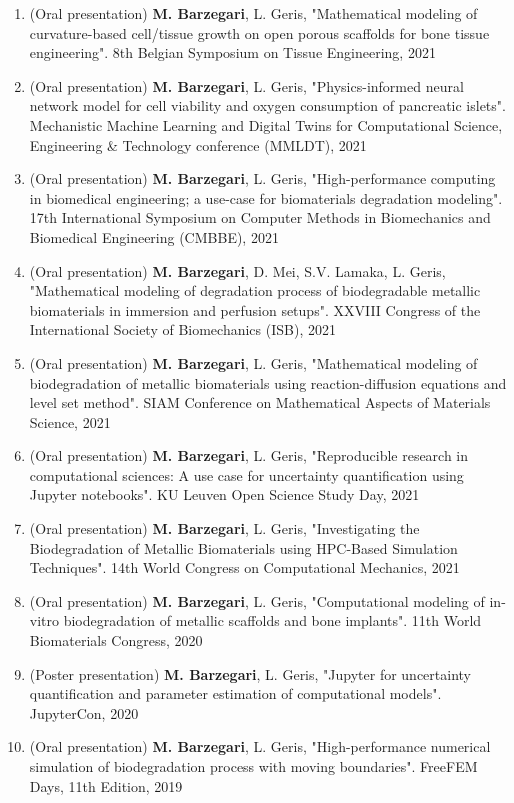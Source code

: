 \documentclass{cv}
\begin{document}
\begin{enumerate}[itemsep=-0.2ex]
\item
(Oral presentation) 
\textbf{M. Barzegari}, L. Geris, "Mathematical modeling of curvature-based cell/tissue growth on open porous scaffolds for bone tissue engineering". 8th Belgian Symposium on Tissue Engineering, 2021
\item
(Oral presentation)
\textbf{M. Barzegari}, L. Geris, "Physics-informed neural network model for cell viability and oxygen consumption of pancreatic islets". Mechanistic Machine Learning and Digital Twins for Computational Science, Engineering \& Technology conference (MMLDT), 2021
\item
(Oral presentation)
\textbf{M. Barzegari}, L. Geris, "High-performance computing in biomedical engineering; a use-case for biomaterials degradation modeling". 17th International Symposium on Computer Methods in Biomechanics and Biomedical Engineering (CMBBE), 2021
\item
(Oral presentation)
\textbf{M. Barzegari}, D. Mei, S.V. Lamaka, L. Geris, "Mathematical modeling of degradation process of biodegradable metallic biomaterials in immersion and perfusion setups". XXVIII Congress of the International Society of Biomechanics (ISB), 2021
\item
(Oral presentation)
\textbf{M. Barzegari}, L. Geris, "Mathematical modeling of biodegradation of metallic biomaterials using reaction-diffusion equations and level set method". SIAM Conference on Mathematical Aspects of Materials Science, 2021
\item
(Oral presentation)
\textbf{M. Barzegari}, L. Geris, "Reproducible research in computational sciences: A use case for uncertainty quantification using Jupyter notebooks". KU Leuven Open Science Study Day, 2021
\item
(Oral presentation)
\textbf{M. Barzegari}, L. Geris, "Investigating the Biodegradation of Metallic Biomaterials using HPC-Based Simulation Techniques". 14th World Congress on Computational Mechanics, 2021
\item
(Oral presentation) 
\textbf{M. Barzegari}, L. Geris, "Computational modeling of in-vitro biodegradation of metallic scaffolds and bone implants". 11th World Biomaterials Congress, 2020
\item
(Poster presentation) 
\textbf{M. Barzegari}, L. Geris, "Jupyter for uncertainty quantification and parameter estimation of computational models". JupyterCon, 2020
\item
(Oral presentation) 
\textbf{M. Barzegari}, L. Geris, "High-performance numerical simulation of biodegradation process with moving boundaries". FreeFEM Days, 11th Edition, 2019

\end{enumerate}
\end{document}
